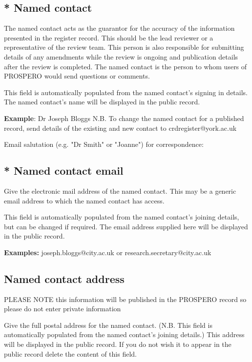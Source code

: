 \documentclass{qqtarticle}
\begin{document}
    \subsection{* Named contact}

    The named contact acts as the guarantor for the accuracy of the information presented in the register record. This should
    be the lead reviewer or a representative of the review team. This person is also responsible for submitting details of any
    amendments while the review is ongoing and publication details after the review is completed. The named contact is the
    person to whom users of PROSPERO would send questions or comments.

    This field is automatically populated from the named contact’s signing in details. The named contact’s name will be
    displayed in the public record.

    \textbf{Example}: Dr Joseph Bloggs
    N.B. To change the named contact for a published record, send details of the existing and new contact to crdregister@york.ac.uk

    Email salutation (e.g. "Dr Smith" or "Joanne") for correspondence:


    \subsection{* Named contact email}
    Give the electronic mail address of the named contact. This may be a generic email address to which the named contact
    has access.

    This field is automatically populated from the named contact’s joining details, but can be changed if required. The email
    address supplied here will be displayed in the public record.

    \textbf{Examples:} joseph.bloggs@city.ac.uk or research.secretary@city.ac.uk

    \subsection{Named contact address}
    PLEASE NOTE this information will be published in the PROSPERO record so please do not enter private information

    Give the full postal address for the named contact. (N.B. This field is automatically populated from the named contact’s
    joining details.)
    This address will be displayed in the public record. If you do not wish it to appear in the public record delete the content of
    this field.
\end{document}

